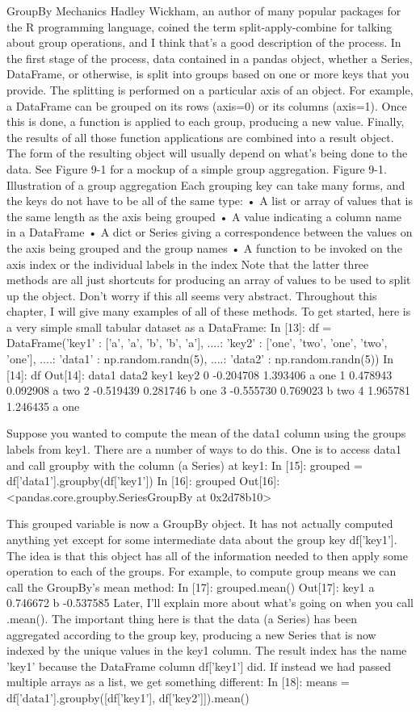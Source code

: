 GroupBy Mechanics
Hadley Wickham, an author of many popular packages for the R programming language,
coined the term split-apply-combine for talking about group operations, and I
think that’s a good description of the process. In the first stage of the process, data
contained in a pandas object, whether a Series, DataFrame, or otherwise, is split into
groups based on one or more keys that you provide. The splitting is performed on a
particular axis of an object. For example, a DataFrame can be grouped on its rows
(axis=0) or its columns (axis=1). Once this is done, a function is applied to each group,
producing a new value. Finally, the results of all those function applications are combined
into a result object. The form of the resulting object will usually depend on what’s
being done to the data. See Figure 9-1 for a mockup of a simple group aggregation.
Figure 9-1. Illustration of a group aggregation
Each grouping key can take many forms, and the keys do not have to be all of the same
type:
• A list or array of values that is the same length as the axis being grouped
• A value indicating a column name in a DataFrame
• A dict or Series giving a correspondence between the values on the axis being
grouped and the group names
• A function to be invoked on the axis index or the individual labels in the index
Note that the latter three methods are all just shortcuts for producing an array of values
to be used to split up the object. Don’t worry if this all seems very abstract. Throughout
this chapter, I will give many examples of all of these methods. To get started, here is
a very simple small tabular dataset as a DataFrame:
In [13]: df = DataFrame({'key1' : ['a', 'a', 'b', 'b', 'a'],
....: 'key2' : ['one', 'two', 'one', 'two', 'one'],
....: 'data1' : np.random.randn(5),
....: 'data2' : np.random.randn(5)})
In [14]: df
Out[14]:
data1 data2 key1 key2
0 -0.204708 1.393406 a one
1 0.478943 0.092908 a two
2 -0.519439 0.281746 b one
3 -0.555730 0.769023 b two
4 1.965781 1.246435 a one

Suppose you wanted to compute the mean of the data1 column using the groups labels
from key1. There are a number of ways to do this. One is to access data1 and call
groupby with the column (a Series) at key1:
In [15]: grouped = df['data1'].groupby(df['key1'])
In [16]: grouped
Out[16]: <pandas.core.groupby.SeriesGroupBy at 0x2d78b10>

This grouped variable is now a GroupBy object. It has not actually computed anything
yet except for some intermediate data about the group key df['key1']. The idea is that
this object has all of the information needed to then apply some operation to each of
the groups. For example, to compute group means we can call the GroupBy’s mean
method:
In [17]: grouped.mean()
Out[17]:
key1
a 0.746672
b -0.537585
Later, I'll explain more about what’s going on when you call .mean(). The important
thing here is that the data (a Series) has been aggregated according to the group key,
producing a new Series that is now indexed by the unique values in the key1 column.
The result index has the name 'key1' because the DataFrame column df['key1'] did.
If instead we had passed multiple arrays as a list, we get something different:
In [18]: means = df['data1'].groupby([df['key1'], df['key2']]).mean()


